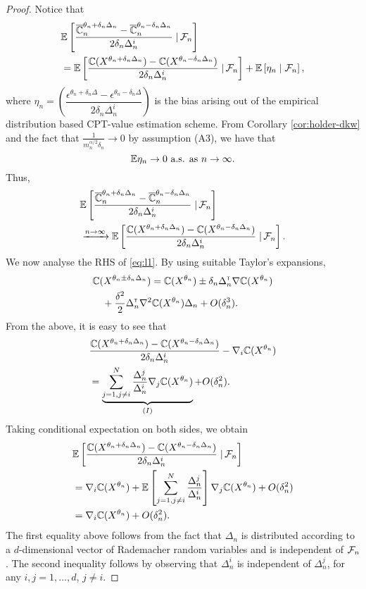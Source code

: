 \begin{proof}
Notice that
\begin{align}
&\mathbb{E}\left[\dfrac{\overline {\mathbb{C}}_n^{\theta_n+\delta_n \Delta_n} -\overline {\mathbb{C}}_n^{\theta_n-\delta_n \Delta_n}}{2 \delta_n \Delta_n^{i}} \left.\right| \mathcal{F}_n\right] \\
&= \mathbb{E}\left[\dfrac{\mathbb{C}(X^{\theta_n + \delta_n \Delta_n}) - \mathbb{C}(X^{\theta_n - \delta_n \Delta_n})}{2 \delta_n \Delta_n^{i}} \left.\right| \mathcal{F}_n\right] + \mathbb{E}\left[ \eta_n \mid \mathcal{F}_n\right],
\end{align}
where $\eta_n = \left(\dfrac{\epsilon^{\theta_n +\delta_n\Delta} - \epsilon^{\theta_n-\delta_n\Delta}}{2\delta_n\Delta_n^{i}}\right)$
 is the bias arising out of the empirical distribution based CPT-value estimation scheme.
From Corollary \ref{cor:holder-dkw} and the fact that $\frac{1}{m_n^{\alpha/2} \delta_n} \rightarrow 0$ by assumption (A3), we have that
$$\mathbb{E} \eta_n \rightarrow 0 \text{ a.s. as } n \rightarrow \infty.$$ 
Thus,
\begin{align}
&\mathbb{E}\left[\dfrac{\overline {\mathbb{C}}_n^{\theta_n+\delta_n \Delta_n} -\overline {\mathbb{C}}_n^{\theta_n-\delta_n \Delta_n}}{2 \delta_n \Delta_n^{i}} \left.\right| \mathcal{F}_n\right] \nonumber\\
&\xrightarrow{n\rightarrow\infty}  \mathbb{E}\left[\dfrac{\mathbb{C}(X^{\theta_n + \delta_n \Delta_n}) -\mathbb{C}(X^{\theta_n - \delta_n \Delta_n})}{2 \delta_n \Delta_n^{i}} \left.\right| \mathcal{F}_n\right].  \label{eq:l1}
\end{align}
We now analyse the RHS of \eqref{eq:l1}.
By using suitable Taylor's expansions,
\begin{align*}
&\mathbb{C}(X^{\theta_n \pm \delta_n \Delta_n}) = \mathbb{C}(X^{\theta_n}) \pm \delta_n \Delta_n^\mathsf{\scriptscriptstyle T} \nabla \mathbb{C}(X^{\theta_n}) \\
&\quad+ \frac{\delta^2}{2} \Delta_n^\mathsf{\scriptscriptstyle T} \nabla^2 \mathbb{C}(X^{\theta_n})\Delta_n + O(\delta_n^3).
\end{align*}
From the above, it is easy to see that 
\begin{align*}
&\dfrac{\mathbb{C}(X^{\theta_n + \delta_n \Delta_n}) - \mathbb{C}(X^{\theta_n - \delta_n \Delta_n})}{2 \delta_n \Delta_n^i}
- \nabla_i \mathbb{C}(X^{\theta_n})\\
&=\underbrace{\sum_{j=1,j\not=i}^{N} \frac{\Delta_n^j}{\Delta_n^i}\nabla_j \mathbb{C}(X^{\theta_n})}_{(I)} + O(\delta_n^2).
\end{align*}
Taking conditional expectation on both sides, we obtain
\begin{align}
&\mathbb{E}\left[\dfrac{\mathbb{C}(X^{\theta_n + \delta_n \Delta_n}) - \mathbb{C}(X^{\theta_n - \delta_n \Delta_n})}{2 \delta_n \Delta_n^i} \left.\right| \mathcal{F}_n\right] \nonumber\\
&= \nabla_i \mathbb{C}(X^{\theta_n}) + \mathbb{E}\left[\sum_{j=1,j\not=i}^{N} \frac{\Delta_n^j}{\Delta_n^i}\right]\nabla_j \mathbb{C}(X^{\theta_n}) + O(\delta_n^2)\nonumber\\
&=  \nabla_i \mathbb{C}(X^{\theta_n}) + O(\delta_n^2).\label{eq:l2}
\end{align}
The first equality above follows from the fact that $\Delta_n$ is distributed according to a $d$-dimensional vector of Rademacher random variables and is independent of $\mathcal{F}_n$. The second inequality follows by observing that $\Delta_n^i$ is independent of $\Delta_n^j$, for any $i,j =1,\ldots,d$, $j\ne i$. 


\end{proof}
